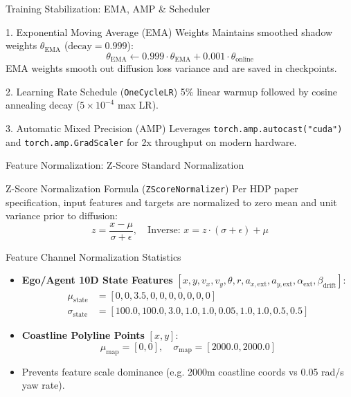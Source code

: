 \documentclass[t]{beamer}
\begin{document}
\begin{frame}{Training Stabilization: EMA, AMP \& Scheduler}
    \begin{block}{1. Exponential Moving Average (EMA) Weights}
        Maintains smoothed shadow weights $\theta_{\mathrm{EMA}}$ ($\text{decay} = 0.999$):
        $$\theta_{\mathrm{EMA}} \leftarrow 0.999 \cdot \theta_{\mathrm{EMA}} + 0.001 \cdot \theta_{\mathrm{online}}$$
        EMA weights smooth out diffusion loss variance and are saved in checkpoints.
    \end{block}

    \begin{block}{2. Learning Rate Schedule (\texttt{OneCycleLR})}
        5\% linear warmup followed by cosine annealing decay ($5 \times 10^{-4}$ max LR).
    \end{block}

    \begin{block}{3. Automatic Mixed Precision (AMP)}
        Leverages \texttt{torch.amp.autocast("cuda")} and \texttt{torch.amp.GradScaler} for 2x throughput on modern hardware.
    \end{block}
\end{frame}

\begin{frame}{Feature Normalization: Z-Score Standard Normalization}
    \begin{block}{Z-Score Normalization Formula (\texttt{ZScoreNormalizer})}
        Per HDP paper specification, input features and targets are normalized to zero mean and unit variance prior to diffusion:
        $$z = \frac{x - \mu}{\sigma + \epsilon}, \quad \text{Inverse: } x = z \cdot (\sigma + \epsilon) + \mu$$
    \end{block}

    \begin{block}{Feature Channel Normalization Statistics}
        \begin{itemize}
            \item \textbf{Ego/Agent 10D State Features} $[x, y, v_x, v_y, \theta, r, a_{x,\mathrm{ext}}, a_{y,\mathrm{ext}}, \alpha_{\mathrm{ext}}, \beta_{\mathrm{drift}}]$:
              $$\begin{aligned}
              \mu_{\mathrm{state}} &= [0, 0, 3.5, 0, 0, 0, 0, 0, 0, 0] \\
              \sigma_{\mathrm{state}} &= [100.0, 100.0, 3.0, 1.0, 1.0, 0.05, 1.0, 1.0, 0.5, 0.5]
              \end{aligned}$$
            \item \textbf{Coastline Polyline Points} $[x, y]$:
              $$\mu_{\mathrm{map}} = [0, 0], \quad \sigma_{\mathrm{map}} = [2000.0, 2000.0]$$
        \end{itemize}
    \end{block}

    \begin{itemize}
        \item Prevents feature scale dominance (e.g. 2000m coastline coords vs 0.05 rad/s yaw rate).
    \end{itemize}
\end{frame}
\end{document}
